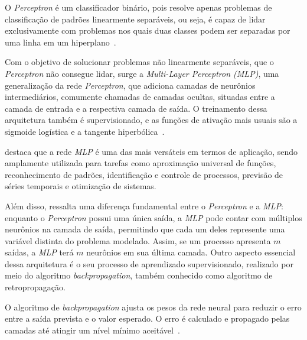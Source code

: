         O \emph{Perceptron} é um classificador binário, pois resolve apenas problemas de classificação de padrões 
        linearmente separáveis, ou seja, é capaz de lidar exclusivamente com problemas nos quais duas classes 
        podem ser separadas por uma linha em um hiperplano~\cite{haykin2009neural}. 

        Com o objetivo de solucionar problemas não linearmente separáveis, que o \emph{Perceptron} não consegue 
        lidar, surge a \emph{Multi-Layer Perceptron (MLP)}, uma generalização da rede \emph{Perceptron}, que 
        adiciona camadas de neurônios intermediários, comumente chamadas de camadas ocultas, situadas entre 
        a camada de entrada e a respectiva camada de saída. O treinamento dessa arquitetura também é 
        supervisionado, e as funções de ativação mais usuais são a sigmoide logística e a tangente 
        hiperbólica~\cite{soares2016mlp}.
        
         destaca que a rede \emph{MLP} é uma das mais versáteis em termos de aplicação, 
        sendo amplamente utilizada para tarefas como aproximação universal de funções, reconhecimento de padrões, 
        identificação e controle de processos, previsão de séries temporais e otimização de sistemas.  

        Além disso,  ressalta uma diferença fundamental entre o \emph{Perceptron} e a \emph{MLP}: 
        enquanto o \emph{Perceptron} possui uma única saída, a \emph{MLP} pode contar com múltiplos neurônios na camada 
        de saída, permitindo que cada um deles represente uma variável distinta do problema modelado. Assim, se um 
        processo apresenta \(m\) saídas, a \emph{MLP} terá \(m\) neurônios em sua última camada. Outro aspecto essencial 
        dessa arquitetura é o seu processo de aprendizado supervisionado, realizado por meio do algoritmo 
        \emph{backpropagation}, também conhecido como algoritmo de retropropagação.


        O algoritmo de \emph{backpropagation} ajusta os pesos da rede neural para reduzir o erro entre a 
        saída prevista e o valor esperado. O erro é calculado e propagado pelas camadas até atingir um nível 
        mínimo aceitável~\cite{marangoni2010}.
        
